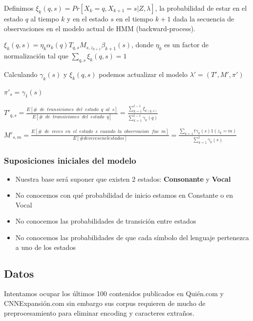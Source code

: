 \documentclass[]{article}
\begin{document}
Definimos $\xi_{k}(q,s)=Pr[X_{k}=q,X_{k+1}=s|Z,\lambda]$, la
probabilidad de estar en el estado $q$ al tiempo $k$ y en el estado $s$
en el tiempo $k+1$ dada la secuencia de observaciones en el modelo
actual de HMM (backward-process).

$\xi_{k}(q,s)=\eta_{k}\alpha_{k}(q)T_{q,s}M_{s,z_{k+1}}\beta_{k+1}(s)$,
donde $\eta_{k}$ es un factor de normalización tal que
$\sum_{q,s}\xi_{k}(q,s)=1$

Calculando $\gamma_{k}(s)$ y $\xi_{k}(q,s)$ podemos actualizar el modelo
$\lambda'=(T',M',\pi')$

$\pi'_{s}=\gamma_{1}(s)$

$T'_{q,s}=\frac{E[\#\phantom{a}de\phantom{a}transiciones\phantom{a}del\phantom{a}estado\phantom{a}q \phantom{a}al\phantom{a}s]}{E[\#\phantom{a}de\phantom{a}transiciones\phantom{a}del\phantom{a}estado\phantom{a}q]}=\frac{\sum_{k=1}^{t-1}\xi_{k(q,s)}}{\sum_{k=1}^{t-1}\gamma_{k}(q)}$

$M'_{s,m}=\frac{E[\#\phantom{a}de\phantom{a}veces\phantom{a}en\phantom{a}el\phantom{a}estado\phantom{a}s\phantom{a}cuando\phantom{a}la\phantom{a}observacion\phantom{a}fue\phantom{a}m]}{E[\# de veces en el estado s]}=\frac{\sum_{k=1}{t}\gamma_{k}(s)1(z_{k}=m)}{\sum_{k=1}^{t}\gamma_{k}(s)}$

\subsubsection{Suposiciones iniciales del
modelo}\label{suposiciones-iniciales-del-modelo}

\begin{itemize}
\itemsep1pt\parskip0pt
\item
  Nuestra base será suponer que existen 2 estados: \textbf{Consonante} y
  \textbf{Vocal}\\
\item
  No conocemos con qué probabilidad de inicio estamos en Constante o en
  Vocal
\item
  No conocemos las probabilidades de transición entre estados
\item
  No conocemos las probabilidades de que cada símbolo del lenguaje
  pertenezca a uno de los estados
\end{itemize}

\subsection{Datos}\label{datos}

Intentamos ocupar los últimos 100 contenidos publicados en Quién.com y
CNNExpansión.com sin embargo sus corpus requieren de mucho de
preprocesamiento para eliminar encoding y caracteres extraños.
\end{document}
